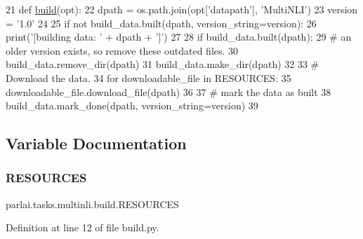 \begin{DoxyCode}
21 \textcolor{keyword}{def }\hyperlink{namespacedialog__babi__feedback_1_1build_a7a9d289f7493a5ded13c4b7f071b6184}{build}(opt):
22     dpath = os.path.join(opt[\textcolor{stringliteral}{'datapath'}], \textcolor{stringliteral}{'MultiNLI'})
23     version = \textcolor{stringliteral}{'1.0'}
24 
25     \textcolor{keywordflow}{if} \textcolor{keywordflow}{not} build\_data.built(dpath, version\_string=version):
26         print(\textcolor{stringliteral}{'[building data: '} + dpath + \textcolor{stringliteral}{']'})
27 
28         \textcolor{keywordflow}{if} build\_data.built(dpath):
29             \textcolor{comment}{# an older version exists, so remove these outdated files.}
30             build\_data.remove\_dir(dpath)
31         build\_data.make\_dir(dpath)
32 
33         \textcolor{comment}{# Download the data.}
34         \textcolor{keywordflow}{for} downloadable\_file \textcolor{keywordflow}{in} RESOURCES:
35             downloadable\_file.download\_file(dpath)
36 
37         \textcolor{comment}{# mark the data as built}
38         build\_data.mark\_done(dpath, version\_string=version)
39 \end{DoxyCode}


\subsection{Variable Documentation}
\mbox{\label{namespaceparlai_1_1tasks_1_1multinli_1_1build_ad2155509724ea13b59597b57bfa59bf5}} 
\subsubsection{\texorpdfstring{R\+E\+S\+O\+U\+R\+C\+ES}{RESOURCES}}
{\footnotesize\ttfamily parlai.\+tasks.\+multinli.\+build.\+R\+E\+S\+O\+U\+R\+C\+ES}



Definition at line 12 of file build.\+py.

